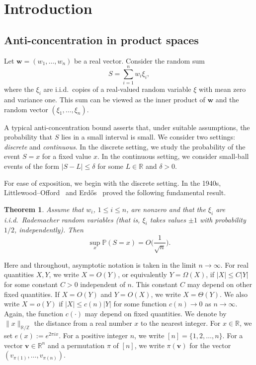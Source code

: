 \documentclass[reqno]{amsart}
\newcommand\R{{\mathbb{R}}}
\newcommand\Z{{\mathbb{Z}}}
\renewcommand\P{{\mathbb{P}}}
\newcommand\BMv{{\bm v}}
\newcommand\BMw{{\bm w}}
\theoremstyle{plain}
\newtheorem{theorem}{Theorem}[section]
\theoremstyle{definition}
\begin{document}
\maketitle


\section{Introduction}



\subsection{Anti-concentration in product spaces} \label{sect:intro}
Let $\BMw=(w_1,\dots,w_n)$ be a real vector. Consider the random sum
\begin{equation}\label{eqn:S}
S = \sum_{i=1}^{n} w_i \xi_i,
\end{equation}
where the $\xi_i$ are i.i.d.\ copies of a real-valued random variable $\xi$ with
mean zero and variance one. This sum can be viewed as the inner product of
$\BMw$ and the random vector $(\xi_1,\dots,\xi_n)$.

A typical anti-concentration bound asserts that, under suitable assumptions, the
probability that $S$ lies in a small interval is small. We consider two
settings: \emph{discrete} and \emph{continuous}. In the discrete setting, we
study the probability of the event $S=x$ for a fixed value $x$. In the
continuous setting, we consider small-ball events of the form
$|S-L|\le \delta$ for some $L\in\R$ and $\delta>0$.

For ease of exposition, we begin with the discrete setting. In the 1940s,
Littlewood--Offord~\cite{LO} and Erd\H{o}s~\cite{Erdos} proved the following
fundamental result.

\begin{theorem}\label{thm:ELO}
Assume that $w_i$, $1\le i\le n$, are nonzero and that the $\xi_i$ are i.i.d.\
Rademacher random variables (that is, $\xi_i$ takes values $\pm1$ with
probability $1/2$, independently). Then
\[
\sup_x \P(S=x) = O\Big(\frac{1}{\sqrt{n}}\Big).
\]
\end{theorem}

\label{notation-sec}
Here and throughout, asymptotic notation is taken in the limit $n\to\infty$.
For real quantities $X,Y$, we write $X = O(Y)$, or equivalently $Y = \Omega(X)$, if $|X| \le C |Y|$ for some constant $C>0$ independent of $n$.
This constant $C$ may depend on other fixed quantities. If $X=O(Y)$ and $Y=O(X)$, we write $X=\Theta(Y)$. We also write $X=o(Y)$ if
$|X|\le c(n)|Y|$ for some function $c(n)\to 0$ as $n\to\infty$. Again, the function $c(\cdot)$ may depend on fixed quantities. We denote by $\|x\|_{\R/\Z}$ the distance from a real number $x$ to the nearest integer. 
For $x \in \R$, we set $e(x) := e^{2\pi i x}$. 
For a positive integer $n$, we write $[n] = \{1,2,\ldots,n\}$. For a vector $\BMv\in\R^n$ and a permutation $\pi$ of $[n]$, we write $\pi(\BMv)$ for the vector $(v_{\pi(1)},\dots,v_{\pi(n)})$.
\end{document}
